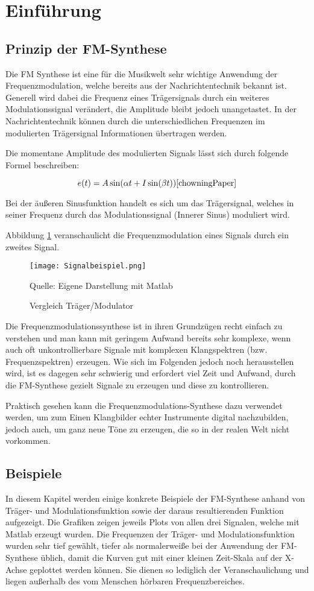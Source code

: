 \section{Einführung}

\subsection{Prinzip der FM-Synthese}
Die FM Synthese ist eine für die Musikwelt sehr wichtige Anwendung der Frequenzmodulation, welche bereits aus der Nachrichtentechnik bekannt ist. Generell wird dabei die Frequenz eines Trägersignals durch ein weiteres Modulationssignal verändert, die Amplitude bleibt jedoch unangetastet. In der Nachrichtentechnik können durch die unterschiedlichen Frequenzen im modulierten Trägersignal Informationen übertragen werden. 

Die momentane Amplitude des modulierten Signals lässt sich durch folgende Formel beschreiben:

\[
e(t) = A\sin(\alpha t + I\sin(\beta t)) \cite{chowningPaper}
\]

Bei der äußeren Sinusfunktion handelt es sich um das Trägersignal, welches in seiner Frequenz durch das Modulationssignal (Innerer Sinus) moduliert wird.

Abbildung \ref{fig:vergleichSignale} veranschaulicht die Frequenzmodulation eines Signals durch ein zweites Signal.

\begin{figure} [ht]
\centering
  \texttt{[image: Signalbeispiel.png]}
\caption{Vergleich Träger/Modulator}
\label{fig:vergleichSignale}
Quelle: Eigene Darstellung mit Matlab
\end{figure}

Die Frequenzmodulationssynthese ist in ihren Grundzügen recht einfach zu verstehen und man kann mit geringem Aufwand bereits sehr komplexe, wenn auch oft unkontrollierbare Signale mit komplexen Klangspektren (bzw. Frequenzspektren) erzeugen. Wie sich im Folgenden jedoch noch herausstellen wird, ist es dagegen sehr schwierig und erfordert viel Zeit und Aufwand, durch die FM-Synthese gezielt Signale zu erzeugen und diese zu kontrollieren.

Praktisch gesehen kann die Frequenzmodulations-Synthese dazu verwendet werden, um zum Einen Klangbilder echter Instrumente digital nachzubilden, jedoch auch, um ganz neue Töne zu erzeugen, die so in der realen Welt nicht vorkommen.

\subsection{Beispiele}
In diesem Kapitel werden einige konkrete Beispiele der FM-Synthese anhand von Träger- und Modulationsfunktion sowie der daraus resultierenden Funktion aufgezeigt. Die Grafiken zeigen jeweils Plots von allen drei Signalen, welche mit Matlab erzeugt wurden.
Die Frequenzen der Träger- und Modulationsfunktion wurden sehr tief gewählt, tiefer als normalerweiße bei der Anwendung der FM-Synthese üblich, damit die Kurven gut mit einer kleinen Zeit-Skala auf der X-Achse geplottet werden können. Sie dienen so lediglich der Veranschaulichung und liegen außerhalb des vom Menschen hörbaren Frequenzbereiches.

